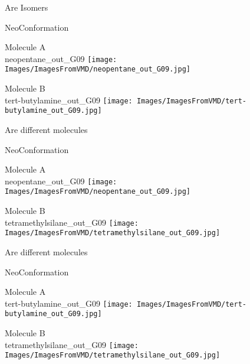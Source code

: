 \begin{center}
\vtab
\vtab
\textcolor{NavyBlue}{\Large Are Isomers}
\end{center}
\newpage
{\Large NeoConformation}
\begin{multicols}{2}
\begin{center}
Molecule A \\ 
neopentane\_out\_G09
\texttt{[image: Images/ImagesFromVMD/neopentane\_out\_G09.jpg]}
\vtab

\columnbreak

Molecule B \\ 
tert-butylamine\_out\_G09
\texttt{[image: Images/ImagesFromVMD/tert-butylamine\_out\_G09.jpg]}
\vtab
\end{center}
\end{multicols}
\begin{center}
\vtab
\vtab
\textcolor{NavyBlue}{\large Are different molecules}
\end{center}
\newpage
{\Large NeoConformation}
\begin{multicols}{2}
\begin{center}
Molecule A \\ 
neopentane\_out\_G09
\texttt{[image: Images/ImagesFromVMD/neopentane\_out\_G09.jpg]}
\vtab

\columnbreak

Molecule B \\ 
tetramethylsilane\_out\_G09
\texttt{[image: Images/ImagesFromVMD/tetramethylsilane\_out\_G09.jpg]}
\vtab
\end{center}
\end{multicols}
\begin{center}
\vtab
\vtab
\textcolor{NavyBlue}{\large Are different molecules}
\end{center}
\newpage
{\Large NeoConformation}
\begin{multicols}{2}
\begin{center}
Molecule A \\ 
tert-butylamine\_out\_G09
\texttt{[image: Images/ImagesFromVMD/tert-butylamine\_out\_G09.jpg]}
\vtab

\columnbreak

Molecule B \\ 
tetramethylsilane\_out\_G09
\texttt{[image: Images/ImagesFromVMD/tetramethylsilane\_out\_G09.jpg]}
\vtab
\end{center}
\end{multicols}
